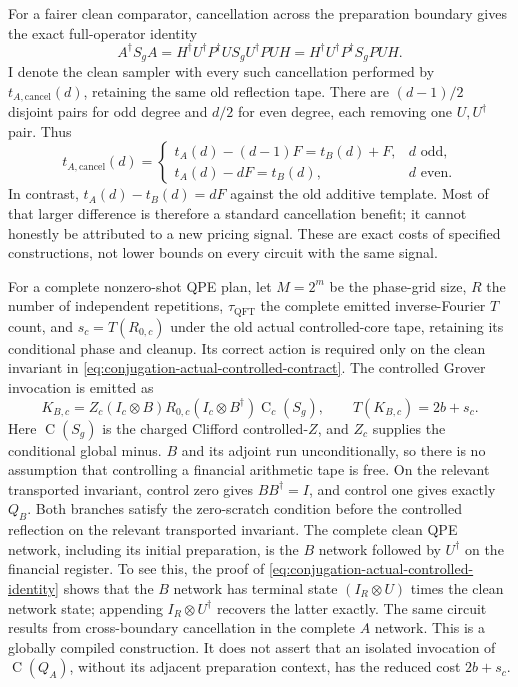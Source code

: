 For a fairer clean comparator, cancellation across the preparation
boundary gives the exact full-operator identity
\begin{equation}
 A^\dagger S_g A
 =H^\dagger U^\dagger P^\dagger U S_g U^\dagger P U H
 =H^\dagger U^\dagger P^\dagger S_g P U H.
 \label{eq:conjugation-cross-boundary}
\end{equation}
I denote the clean sampler with every such cancellation performed by
$t_{A,\mathrm{cancel}}(d)$, retaining the same old reflection tape.
There are $(d-1)/2$ disjoint pairs for odd degree and $d/2$ for even
degree, each removing one $U,U^\dagger$ pair. Thus
\begin{equation}
 t_{A,\mathrm{cancel}}(d)=
 \begin{cases}
  t_A(d)-(d-1)F=t_B(d)+F,&d\text{ odd},\\
  t_A(d)-dF=t_B(d),&d\text{ even}.
 \end{cases}
 \label{eq:conjugation-clean-baseline}
\end{equation}
In contrast, $t_A(d)-t_B(d)=dF$ against the old additive template.
Most of that larger difference is therefore a standard cancellation
benefit; it cannot honestly be attributed to a new pricing signal.
These are exact costs of specified constructions, not lower bounds
on every circuit with the same signal.

For a complete nonzero-shot QPE plan, let $M=2^m$ be the phase-grid
size, $R$ the number of independent repetitions, $\tau_{\mathrm{QFT}}$
the complete emitted inverse-Fourier $T$ count, and
$s_c=T(R_{0,c})$ under the old actual controlled-core tape, retaining
its conditional phase and cleanup. Its correct action is required
only on the clean invariant in
\eqref{eq:conjugation-actual-controlled-contract}.
The controlled Grover invocation is emitted as
\begin{equation}
 K_{B,c}
 =Z_c(I_c\otimes B)R_{0,c}
       (I_c\otimes B^\dagger)\operatorname C_c(S_g),
 \qquad T(K_{B,c})=2b+s_c.
 \label{eq:conjugation-controlled-resource}
\end{equation}
Here $\operatorname C(S_g)$ is the charged Clifford controlled-$Z$,
and $Z_c$ supplies the conditional global minus. $B$ and its adjoint
run unconditionally, so there is no assumption that controlling a
financial arithmetic tape is free. On the relevant transported
invariant, control zero gives $BB^\dagger=I$, and control one gives
exactly $Q_B$.
Both branches satisfy the zero-scratch condition before the controlled
reflection on the relevant transported invariant. The complete clean
QPE network, including its initial preparation, is the $B$ network
followed by $U^\dagger$ on the financial register. To see this, the
proof of \eqref{eq:conjugation-actual-controlled-identity} shows that
the $B$ network
has terminal state $(I_R\otimes U)$ times the clean network state;
appending $I_R\otimes U^\dagger$ recovers the latter exactly. The
same circuit results from cross-boundary cancellation in the complete
$A$ network. This is a globally compiled construction. It does not
assert that an isolated invocation of $\operatorname C(Q_A)$, without
its adjacent preparation context, has the reduced cost
$2b+s_c$.

